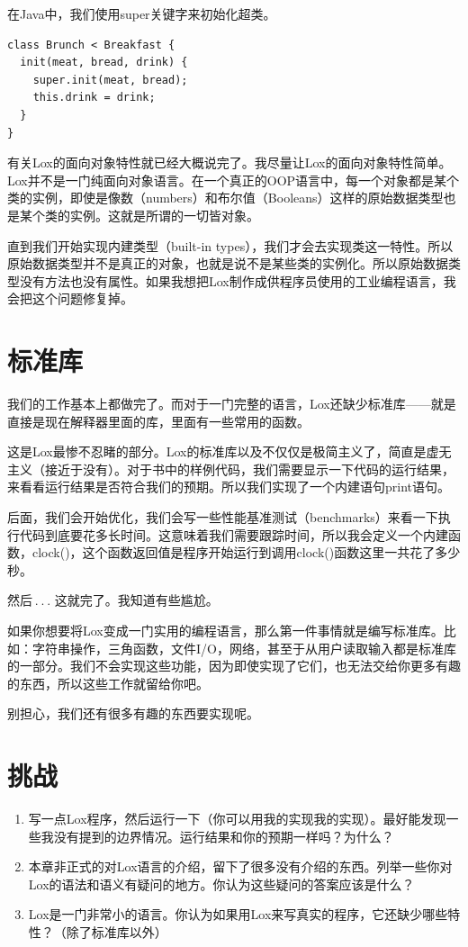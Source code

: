 \documentclass[cn,10pt,math=newtx,citestyle=gb7714-2015,bibstyle=gb7714-2015]{elegantbook}
\begin{document}
在Java中，我们使用super关键字来初始化超类。

\begin{verbatim}
class Brunch < Breakfast {
  init(meat, bread, drink) {
    super.init(meat, bread);
    this.drink = drink;
  }
}
\end{verbatim}

有关Lox的面向对象特性就已经大概说完了。我尽量让Lox的面向对象特性简单。Lox并不是一门纯面向对象语言。在一个真正的OOP语言中，每一个对象都是某个类的实例，即使是像数（numbers）和布尔值（Booleans）这样的原始数据类型也是某个类的实例。这就是所谓的一切皆对象。

直到我们开始实现内建类型（built-in types），我们才会去实现类这一特性。所以原始数据类型并不是真正的对象，也就是说不是某些类的实例化。所以原始数据类型没有方法也没有属性。如果我想把Lox制作成供程序员使用的工业编程语言，我会把这个问题修复掉。

\section{标准库}

我们的工作基本上都做完了。而对于一门完整的语言，Lox还缺少标准库——就是直接是现在解释器里面的库，里面有一些常用的函数。

这是Lox最惨不忍睹的部分。Lox的标准库以及不仅仅是极简主义了，简直是虚无主义（接近于没有）。对于书中的样例代码，我们需要显示一下代码的运行结果，来看看运行结果是否符合我们的预期。所以我们实现了一个内建语句print语句。

后面，我们会开始优化，我们会写一些性能基准测试（benchmarks）来看一下执行代码到底要花多长时间。这意味着我们需要跟踪时间，所以我会定义一个内建函数，clock()，这个函数返回值是程序开始运行到调用clock()函数这里一共花了多少秒。

然后 . . . 这就完了。我知道有些尴尬。

如果你想要将Lox变成一门实用的编程语言，那么第一件事情就是编写标准库。比如：字符串操作，三角函数，文件I/O，网络，甚至于从用户读取输入都是标准库的一部分。我们不会实现这些功能，因为即使实现了它们，也无法交给你更多有趣的东西，所以这些工作就留给你吧。

别担心，我们还有很多有趣的东西要实现呢。

\section{挑战}

\begin{enumerate}
\item 写一点Lox程序，然后运行一下（你可以用我的实现我的实现）。最好能发现一些我没有提到的边界情况。运行结果和你的预期一样吗？为什么？
\item 本章非正式的对Lox语言的介绍，留下了很多没有介绍的东西。列举一些你对Lox的语法和语义有疑问的地方。你认为这些疑问的答案应该是什么？
\item Lox是一门非常小的语言。你认为如果用Lox来写真实的程序，它还缺少哪些特性？（除了标准库以外）
\end{enumerate}
\end{document}
